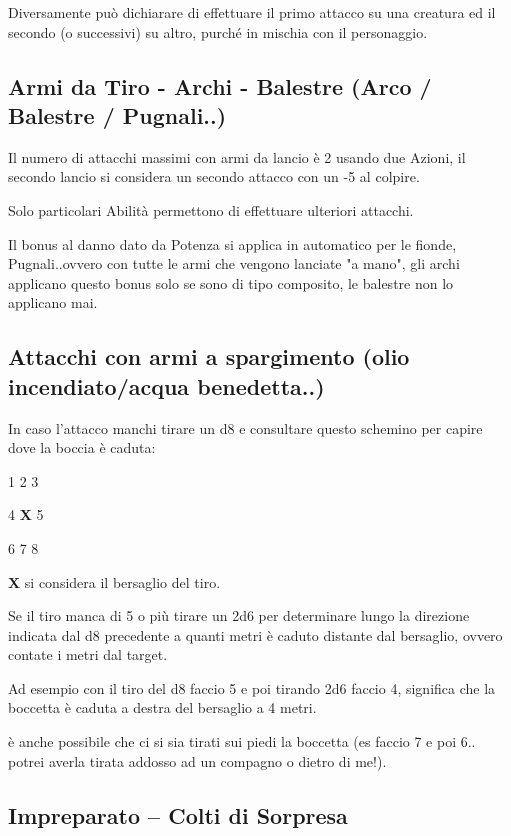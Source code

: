 \documentclass[a4paper,11pt,twoside,openany]{book}
\begin{document}
Diversamente può dichiarare di effettuare il primo attacco su una creatura ed il secondo (o successivi) su altro, purché in mischia con il personaggio.

\subsection{Armi da Tiro - Archi - Balestre (Arco / Balestre / Pugnali..)}

Il numero di attacchi massimi con armi da lancio è 2 usando due Azioni, il secondo lancio si considera un secondo attacco con un -5 al colpire.

Solo particolari Abilità permettono di effettuare ulteriori attacchi.

Il bonus al danno dato da Potenza si applica in automatico per le fionde, Pugnali..ovvero con tutte le armi che vengono lanciate "a mano", gli archi applicano questo bonus solo se sono di tipo composito, le balestre non lo applicano mai.

\subsection{Attacchi con armi a spargimento (olio incendiato/acqua benedetta..)}

In caso l'attacco manchi tirare un d8 e consultare questo schemino per capire dove la boccia è caduta:

1 2 3

4 \textbf{X} 5

6 7 8

\textbf{X} si considera il bersaglio del tiro.

Se il tiro manca di 5 o più tirare un 2d6 per determinare lungo la direzione indicata dal d8 precedente a quanti metri è caduto distante dal bersaglio, ovvero contate i metri dal target.

Ad esempio con il tiro del d8 faccio 5 e poi tirando 2d6 faccio 4, significa che la boccetta è caduta a destra del bersaglio a 4 metri.

è anche possibile che ci si sia tirati sui piedi la boccetta (es faccio 7 e poi 6.. potrei averla tirata addosso ad un compagno o dietro di me!).

\subsection{Impreparato -- Colti di Sorpresa}
\end{document}
